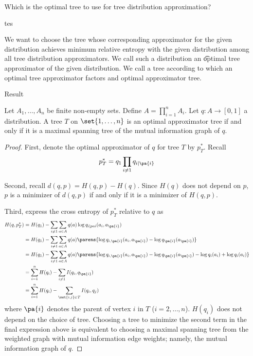 

Which is the optimal tree to use for tree distribution approximation?

tes

We want to choose the tree whose corresponding approximator for the given distribution achieves minimum relative entropy with the given distribution among all tree distribution approximators.
We call such a distribution an \t{optimal tree approximator} of the given distribution.
We call a tree according to which an optimal tree approximator factors and optimal approximator tree.

{Result}

\begin{prop}

Let $A_1, \dots, A_n$ be finite non-empty sets.
Define $A = \prod_{i = 1}^{n} A_i$.
Let $q: A \to [0, 1]$ a distribution.
A tree $T$ on $\set{1, \dots, n}$ is an optimal approximator tree if and only if it is a maximal spanning tree of the mutual information graph of $q$.

\begin{proof}
First, denote the optimal approximator of $q$ for tree $T$ by $p^*_T$. Recall
$$
  p^*_T = q_1 \prod_{i \neq 1} q_{i \mid \pa{i}}
$$

Second, recall $d(q, p) = H(q, p) - H(q)$.
Since $H(q)$ does not depend on $p$, $p$ is a minimizer of $d(q, p)$ if and only if it is a minimizer of $H(q, p)$.

Third, express the cross entropy of $p^*_T$ relative to $q$ as
$$
\begin{aligned}
  H(q, p^*_T) &= H(q_1) - \sum_{i \neq 1} \sum_{a \in A} q(a)\log q_{i \mid pa{i}}(a_i, a_{\pa{i}}) \\
              &= H(q_1) - \sum_{i \neq 1} \sum_{a \in A} q(a)\parens{\log q_{i,\pa{i}}(a_i, a_{\pa{i}}) - \log q_{\pa{i}}(a_{\pa{i}})} \\
              &= H(q_1) - \sum_{i \neq 1} \sum_{a \in A} q(a)\parens{\log q_{i,\pa{i}}(a_i, a_{\pa{i}}) - \log q_{\pa{i}}(a_{\pa{i}}) - \log q_i(a_i)  + \log q_{i}(a_i)} \\
              &= \sum_{i = 1}^{n} H(q_i) - \sum_{i \neq 1} I(q_i, q_{\pa{i}}) \\
              &= \sum_{i = 1}^{n} H(q_i) - \sum_{\set{i,j} \in T} I(q_i, q_{j}) \\
\end{aligned}
$$
where $\pa{i}$ denotes the parent of vertex $i$ in $T$ ($i = 2, \dots, n$).
$H(q_i)$ does not depend on the choice of tree.
Choosing a tree to minimize the second term in the final expression above is equivalent to choosing a maximal spanning tree from the weighted graph with mutual information edge weights; namely, the mutual information graph of $q$.

\end{proof}

\end{prop}
